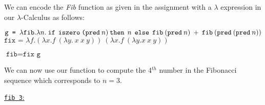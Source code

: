 \documentclass[12pt, fleqn]{article}
\begin{document}
We can encode the \emph{Fib} function as given in the assignment with a $\lambda$ expression
in our $\lambda$-Calculus as follows:
\begin{center}
    $\texttt{g = }\lambda \texttt{fib}.\lambda n.
    \texttt{\:if}\:\:\texttt{iszero\:(pred}\:n)\:\texttt{then}\:\:n\:\:\texttt{else}
    \:\:\texttt{fib}\:(\texttt{pred}\:n)\:
            +\:\texttt{fib}\:(\texttt{pred}\:(\texttt{pred}\:n))$
    $\texttt{fix = }\lambda f.(\lambda x.f\:(\lambda y.\:x\:x\:y))\:(\lambda x.f\:(\lambda y.x\:x\:y))$
\end{center}
\begin{center}
    $\texttt{fib} = \texttt{fix g}$
\end{center}
We can now use our function to compute the 4$^{th}$ number in the Fibonacci sequence which corresponds to $n = 3$.
\begin{center}
    \underline{\texttt{fib 3}:}
\end{center}
\end{document}
